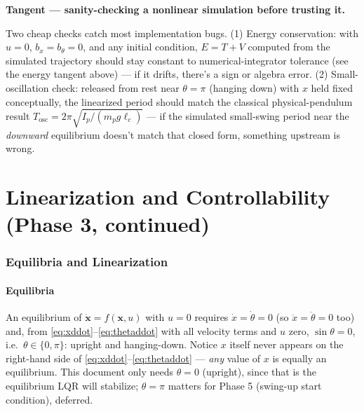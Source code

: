 \documentclass[11pt]{article}
\newenvironment{tangent}[1]{%
  \par\smallskip\noindent\hrulefill\par
  \noindent\textbf{Tangent — #1.}\par\smallskip
  \begingroup\itshape
}{%
  \endgroup
  \par\noindent\hrulefill\par\smallskip
}
\newcommand{\mb}[1]{\mathbf{#1}}
\begin{document}
\begin{tangent}{sanity-checking a nonlinear simulation before trusting it}
Two cheap checks catch most implementation bugs. (1) Energy conservation:
with $u=0$, $b_x=b_\theta=0$, and any initial condition, $E=T+V$ computed
from the simulated trajectory should stay constant to numerical-integrator
tolerance (see the energy tangent above) — if it drifts, there's a sign or
algebra error. (2) Small-oscillation check: released from rest near
$\theta=\pi$ (hanging down) with $x$ held fixed conceptually, the linearized
period should match the classical physical-pendulum result $T_{\text{osc}}
= 2\pi\sqrt{I_p/(m_p g\ell_c)}$ — if the simulated small-swing period near
the \emph{downward} equilibrium doesn't match that closed form, something
upstream is wrong.
\end{tangent}

\part{Linearization and Controllability (Phase 3, continued)}

\section{Equilibria and Linearization}
\label{sec:equilibria}

\subsection{Equilibria}
An equilibrium of $\dot{\mb x}=f(\mb x,u)$ with $u=0$ requires
$\dot x=\dot\theta=0$ (so $\ddot x=\ddot\theta=0$ too) and, from
\eqref{eq:xddot}--\eqref{eq:thetaddot} with all velocity terms and $u$
zero, $\sin\theta = 0$, i.e.\ $\theta \in \{0,\pi\}$: upright and
hanging-down. Notice $x$ itself never appears on the right-hand side of
\eqref{eq:xddot}--\eqref{eq:thetaddot} — \emph{any} value of $x$ is
equally an equilibrium. This document only needs $\theta=0$ (upright),
since that is the equilibrium LQR will stabilize; $\theta=\pi$ matters for
Phase 5 (swing-up start condition), deferred.
\end{document}
